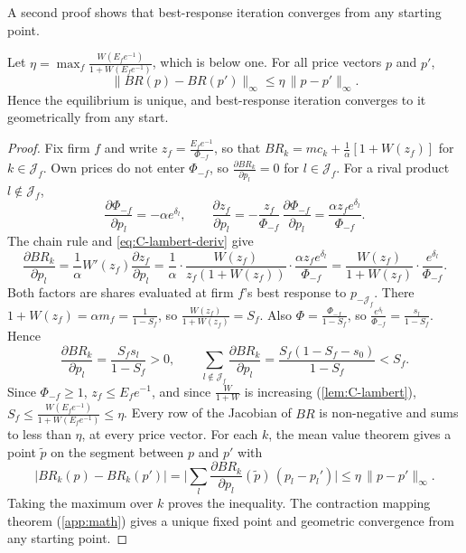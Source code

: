 A second proof shows that best-response iteration converges from any starting point.

\begin{proposition}\label{prop:C-contraction}
Let $\eta = \max_f\frac{W(E_fe^{-1})}{1 + W(E_fe^{-1})}$, which is below one. For all price vectors $p$ and $p'$,
\begin{equation*}
  \|BR(p) - BR(p')\|_\infty \le \eta\,\|p - p'\|_\infty .
\end{equation*}
Hence the equilibrium is unique, and best-response iteration converges to it geometrically from any start.
\end{proposition}

\begin{proof}
Fix firm $f$ and write $z_f = \frac{E_fe^{-1}}{\Phi_{-f}}$, so that $BR_k = mc_k + \frac{1}{\alpha}[1 + W(z_f)]$ for
$k \in \mathcal{J}_f$. Own prices do not enter $\Phi_{-f}$, so $\frac{\partial BR_k}{\partial p_l} = 0$ for
$l \in \mathcal{J}_f$. For a rival product $l \notin \mathcal{J}_f$,
\begin{equation*}
  \frac{\partial\Phi_{-f}}{\partial p_l} = -\alpha e^{\delta_l} , \qquad
  \frac{\partial z_f}{\partial p_l} = -\frac{z_f}{\Phi_{-f}}\,\frac{\partial\Phi_{-f}}{\partial p_l} = \frac{\alpha z_fe^{\delta_l}}{\Phi_{-f}} .
\end{equation*}
The chain rule and \eqref{eq:C-lambert-deriv} give
\begin{equation*}
  \frac{\partial BR_k}{\partial p_l} = \frac{1}{\alpha}W'(z_f)\frac{\partial z_f}{\partial p_l}
  = \frac{1}{\alpha}\cdot\frac{W(z_f)}{z_f(1 + W(z_f))}\cdot\frac{\alpha z_fe^{\delta_l}}{\Phi_{-f}}
  = \frac{W(z_f)}{1 + W(z_f)}\cdot\frac{e^{\delta_l}}{\Phi_{-f}} .
\end{equation*}
Both factors are shares evaluated at firm $f$'s best response to $p_{-\mathcal{J}_f}$. There
$1 + W(z_f) = \alpha m_f = \frac{1}{1 - S_f}$, so $\frac{W(z_f)}{1 + W(z_f)} = S_f$. Also
$\Phi = \frac{\Phi_{-f}}{1 - S_f}$, so $\frac{e^{\delta_l}}{\Phi_{-f}} = \frac{s_l}{1 - S_f}$. Hence
\begin{equation}\label{eq:C-br-slope}
  \frac{\partial BR_k}{\partial p_l} = \frac{S_fs_l}{1 - S_f} > 0 , \qquad
  \sum_{l \notin \mathcal{J}_f}\frac{\partial BR_k}{\partial p_l} = \frac{S_f(1 - S_f - s_0)}{1 - S_f} < S_f .
\end{equation}
Since $\Phi_{-f} \ge 1$, $z_f \le E_fe^{-1}$, and since $\frac{W}{1 + W}$ is increasing (\cref{lem:C-lambert}),
$S_f \le \frac{W(E_fe^{-1})}{1 + W(E_fe^{-1})} \le \eta$. Every row of the Jacobian of $BR$ is non-negative and sums to
less than $\eta$, at every price vector. For each $k$, the mean value theorem gives a point $\tilde p$ on the segment
between $p$ and $p'$ with
\begin{equation*}
  |BR_k(p) - BR_k(p')| = \Big|\sum_l\frac{\partial BR_k}{\partial p_l}(\tilde p)\,(p_l - p_l')\Big|
  \le \eta\,\|p - p'\|_\infty .
\end{equation*}
Taking the maximum over $k$ proves the inequality. The contraction mapping theorem (\cref{app:math}) gives a unique
fixed point and geometric convergence from any starting point.
\end{proof}

